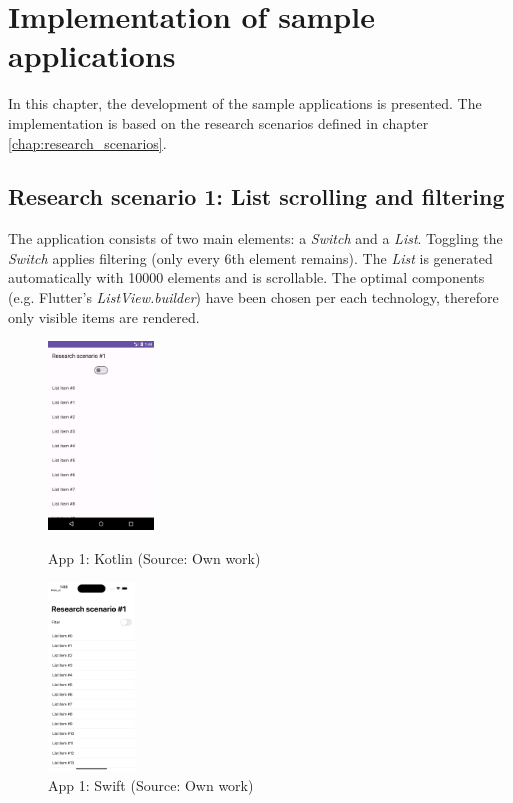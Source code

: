 
\chapter{Implementation of sample applications}

In this chapter, the development of the sample applications is presented. The implementation is based on the research scenarios defined in chapter \ref{chap:research_scenarios}.

\section{Research scenario 1: List scrolling and filtering}

The application consists of two main elements: a \emph{Switch} and a \emph{List}. Toggling the \emph{Switch} applies filtering (only every 6th element remains). The \emph{List} is generated automatically with 10000 elements and is scrollable. The optimal components (e.g. Flutter's \emph{ListView.builder}) have been chosen per each technology, therefore only visible items are rendered.

\begin{figure}[H]
    \begin{minipage}{.47\textwidth}
      \centering
      \includegraphics[height=50mm]{img/app1_kotlin}
      \caption{App 1: Kotlin (Source: Own work)}
      \label{fig:app1_kotlin}
    \end{minipage}
    \hfill
    \begin{minipage}{.47\textwidth}
      \centering
      \includegraphics[height=50mm]{img/app1_swift}
      \caption{App 1: Swift (Source: Own work)}
      \label{fig:app1_swift}
    \end{minipage}
\end{figure}

